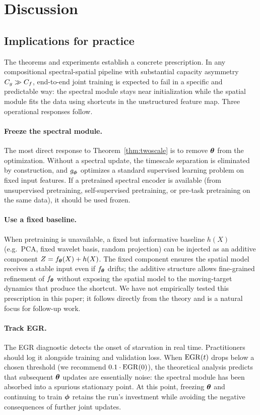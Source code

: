 \section{Discussion}
\label{sec:discussion}

\subsection{Implications for practice}

The theorems and experiments establish a concrete prescription. In any
compositional spectral-spatial pipeline with substantial capacity
asymmetry $C_g \gg C_f$, end-to-end joint training is expected to fail
in a specific and predictable way: the spectral module stays near
initialization while the spatial module fits the data using shortcuts
in the unstructured feature map. Three operational responses follow.

\paragraph{Freeze the spectral module.}
The most direct response to Theorem~\ref{thm:twoscale} is to remove
${\boldsymbol{\theta}}$ from the optimization. Without a spectral update, the
timescale separation is eliminated by construction, and $g_{\boldsymbol{\phi}}$
optimizes a standard supervised learning problem on fixed input
features. If a pretrained spectral encoder is available (from
unsupervised pretraining, self-supervised pretraining, or pre-task
pretraining on the same data), it should be used frozen.

\paragraph{Use a fixed baseline.}
When pretraining is unavailable, a fixed but informative baseline
$h(X)$ (e.g.\ PCA, fixed wavelet basis, random projection) can be
injected as an additive component $Z = f_{\boldsymbol{\theta}}(X) + h(X)$. The
fixed component ensures the spatial model receives a stable input even
if $f_{\boldsymbol{\theta}}$ drifts; the additive structure allows fine-grained
refinement of $f_{\boldsymbol{\theta}}$ without exposing the spatial model to the
moving-target dynamics that produce the shortcut. We have not
empirically tested this prescription in this paper; it follows
directly from the theory and is a natural focus for follow-up work.

\paragraph{Track EGR.}
The EGR diagnostic detects the onset of starvation in real time.
Practitioners should log it alongside training and validation loss.
When $\mathrm{EGR}(t)$ drops below a chosen threshold (we recommend $0.1
\cdot \mathrm{EGR}(0)$), the theoretical analysis predicts that subsequent
${\boldsymbol{\theta}}$ updates are essentially noise: the spectral module has been
absorbed into a spurious stationary point. At this point, freezing
${\boldsymbol{\theta}}$ and continuing to train ${\boldsymbol{\phi}}$ retains the run's
investment while avoiding the negative consequences of further joint
updates.

